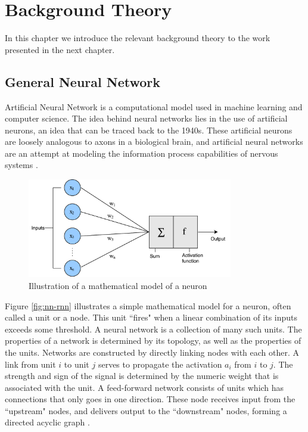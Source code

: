 
\chapter{Background Theory}
\label{ch:background}
In this chapter we introduce the relevant background theory to the work presented in the next chapter. 


\section{General Neural Network}
Artificial Neural Network is a computational model used in machine learning and computer science. The idea behind neural networks lies in the use of artificial neurons, an idea that can be traced back to the 1940s. These artificial neurons are loosely analogous to axons in a biological brain, and artificial neural networks are an attempt at modeling the information process capabilities of nervous systems \citep{russell2010aimodernapproach}.

\begin{figure}[ht]
    \centering
    \includegraphics[width=0.8\textwidth]{fig/related_work/nn_perceptron.pdf}
    \caption{Illustration of a mathematical model of a neuron}
    \label{fig:nn-perceptron}
\end{figure}

Figure \ref{fig:nn-rnn} illustrates a simple mathematical model for a neuron, often called a unit or a node. This unit ``fires" when a linear combination of its inputs exceeds some threshold. A neural network is a collection of many such units. The properties of a network is determined by its topology, as well as the properties of the units. Networks are constructed by directly linking nodes with each other. A link from unit \(i\) to unit \(j\) serves to propagate the activation \(a_{i}\) from \(i\) to \(j\). The strength and sign of the signal is determined by the numeric weight that is associated with the unit. A feed-forward network consists of units which has connections that only goes in one direction. These node receives input from the ``upstream" nodes, and delivers output to the ``downstream" nodes, forming a directed acyclic graph \citep{russell2010aimodernapproach}.

